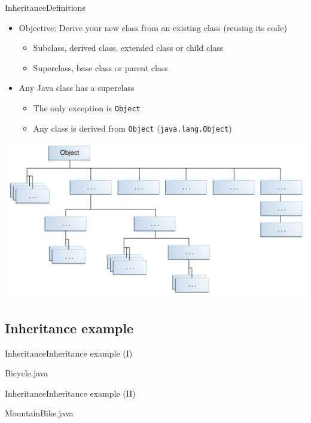 \documentclass[10pt,compress]{beamer} %
\begin{document}
\begin{frame}[shrink]{Inheritance}{Definitions}
	\begin{itemize}
		\item Objective: Derive your new class from an existing class (reusing its code)
		\begin{itemize}
		\item Subclass, derived class, extended class or child class
		\item Superclass, base class or parent class
		\end{itemize}
		\item Any Java class has a superclass
		\begin{itemize}
		\item The only exception is \texttt{Object}
		\item Any class is derived from \texttt{Object} (\texttt{java.lang.Object})
		\end{itemize}
	\end{itemize}
	
	\begin{center} 
		\includegraphics[width=0.5\linewidth]{figs/classes-object.png}
	\end{center}
\end{frame}

\subsection{Inheritance example}
\begin{frame}[shrink]{Inheritance}{Inheritance example (I)}
	\vspace{-0.2cm}
	\begin{block}{Bicycle.java}
		\vspace{-0.2cm}
		
		\vspace{-0.2cm}
	\end{block}
\end{frame}

\begin{frame}[shrink]{Inheritance}{Inheritance example (II)}
	\vspace{-0.2cm}
	\begin{block}{MountainBike.java}
		\vspace{-0.2cm}
		
		\vspace{-0.2cm}
	\end{block}
\end{frame}
\end{document}
